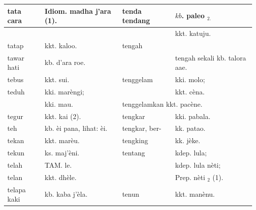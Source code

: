 \documentclass[10pt]{article}
\begin{document}
\begin{center}
\begin{tabular}{|l|l|l|l|}
\hline
tata cara & Idiom. madha j'ara (1). & tenda tendang & \(k b\). paleo \(_{2 .}\) \\
\hline
 &  &  & kkt. katuju. \\
\hline
tatap & kkt. kaloo. & tengah &  \\
\hline
tawar hati & kb. d'ara roe. &  & tengah sekali kb. talora aae. \\
\hline
tebus & kkt. sui. & tenggelam & kki. molo; \\
\hline
teduh & kki. marèngi; &  & kkt. cèna. \\
\hline
 & kki. mau. & \multicolumn{2}{|l|}{tenggelamkan kkt. pacène.} \\
\hline
tegur & kkt. kai (2). & tengkar & kki. pabala. \\
\hline
teh & kb. èi pana, lihat: èi. & tengkar, ber- & kk. patao. \\
\hline
tekan & kkt. marèu. & tengking & kk. jèke. \\
\hline
tekun & ks. maj'èni. & tentang & kdep. lula; \\
\hline
telah & TAM. le. &  & kdep. lula nèti; \\
\hline
telan & kkt. dhèle. &  & Prep. nèti \({ }_{2}\) (1). \\
\hline
telapa kaki & kb. kaba j'èla. & tenun & kkt. manènu. \\
\hline
\end{tabular}
\end{center}
\end{document}
